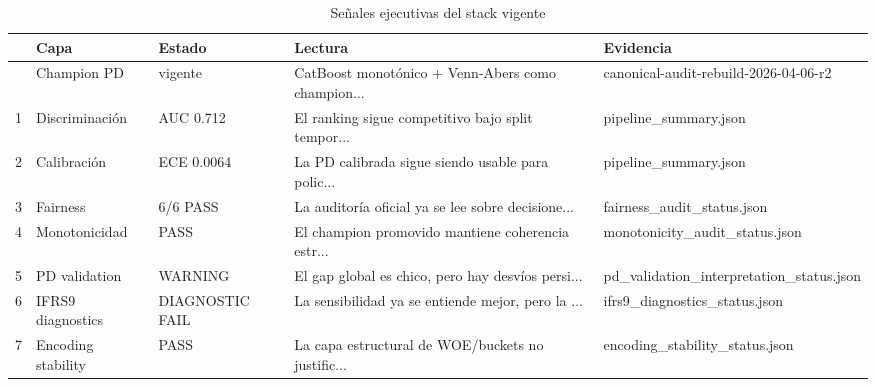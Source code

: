 \documentclass[
  spanish,
  11pt,
  letterpaper,
]{scrbook}
\theoremstyle{plain}
\theoremstyle{remark}
\begin{document}
{

\begin{longtable}[]{@{}lllll@{}}

\caption{\label{tbl-executive-signals}Señales ejecutivas del stack
vigente}

\tabularnewline

\toprule\noalign{}
& Capa & Estado & Lectura & Evidencia \\
\midrule\noalign{}
\endhead
\bottomrule\noalign{}
\endlastfoot
0 & Champion PD & vigente & CatBoost monotónico + Venn-Abers como
champion... & canonical-audit-rebuild-2026-04-06-r2 \\
1 & Discriminación & AUC 0.712 & El ranking sigue competitivo bajo split
tempor... & pipeline\_summary.json \\
2 & Calibración & ECE 0.0064 & La PD calibrada sigue siendo usable para
polic... & pipeline\_summary.json \\
3 & Fairness & 6/6 PASS & La auditoría oficial ya se lee sobre
decisione... & fairness\_audit\_status.json \\
4 & Monotonicidad & PASS & El champion promovido mantiene coherencia
estr... & monotonicity\_audit\_status.json \\
5 & PD validation & WARNING & El gap global es chico, pero hay desvíos
persi... & pd\_validation\_interpretation\_status.json \\
6 & IFRS9 diagnostics & DIAGNOSTIC FAIL & La sensibilidad ya se entiende
mejor, pero la ... & ifrs9\_diagnostics\_status.json \\
7 & Encoding stability & PASS & La capa estructural de WOE/buckets no
justific... & encoding\_stability\_status.json \\

\end{longtable}

}
\end{document}

